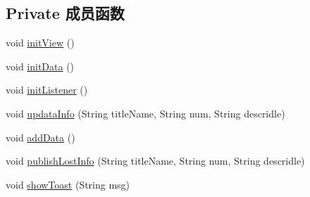\subsection*{Private 成员函数}
\begin{DoxyCompactItemize}
\item 
void \mbox{\hyperlink{classcom_1_1example_1_1akisame__lin_1_1love__air2_1_1_add_weibo_information_activity_a20c538774e7a4edb64e996a28bfbcfbe}{init\+View}} ()
\item 
void \mbox{\hyperlink{classcom_1_1example_1_1akisame__lin_1_1love__air2_1_1_add_weibo_information_activity_ac3840182c501ac881e45c5bbf90cf399}{init\+Data}} ()
\item 
void \mbox{\hyperlink{classcom_1_1example_1_1akisame__lin_1_1love__air2_1_1_add_weibo_information_activity_a116dc183f4b8d276551e2054d86cd2df}{init\+Listener}} ()
\item 
void \mbox{\hyperlink{classcom_1_1example_1_1akisame__lin_1_1love__air2_1_1_add_weibo_information_activity_ab236a62ef9d6c67cae32cad6b77ee753}{updata\+Info}} (String title\+Name, String num, String descridle)
\item 
void \mbox{\hyperlink{classcom_1_1example_1_1akisame__lin_1_1love__air2_1_1_add_weibo_information_activity_af7cb946a9becc4fb5e433c8228cae507}{add\+Data}} ()
\item 
void \mbox{\hyperlink{classcom_1_1example_1_1akisame__lin_1_1love__air2_1_1_add_weibo_information_activity_a0a8bf20e1535873ebb5406a6c2a39f96}{publish\+Lost\+Info}} (String title\+Name, String num, String descridle)
\item 
void \mbox{\hyperlink{classcom_1_1example_1_1akisame__lin_1_1love__air2_1_1_add_weibo_information_activity_a7a55c58de1ed98ce6792f1f959160250}{show\+Toast}} (String msg)
\end{DoxyCompactItemize}
